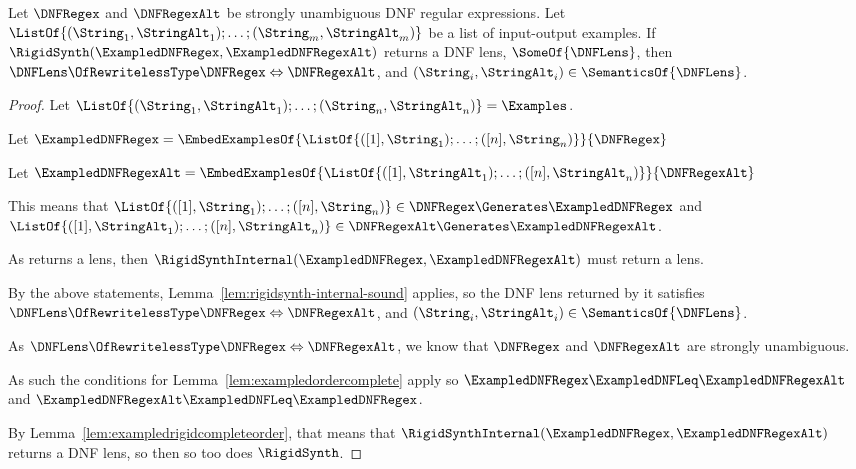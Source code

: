 \documentclass[acmsmall,screen]{acmart}
\begin{document}
\begin{mylemma}
  \label{lem:rigidsynth-sound}
  Let $\DNFRegex$ and $\DNFRegexAlt$ be strongly unambiguous DNF regular
  expressions.
  Let\\ $\ListOf{(\String_1,\StringAlt_1);\ldots;(\String_m,\StringAlt_m)}$ be a
  list of input-output examples.
  If $\RigidSynth(\ExampledDNFRegex,\ExampledDNFRegexAlt)$ returns
  a DNF lens, $\SomeOf{\DNFLens}$, then  $\DNFLens \OfRewritelessType \DNFRegex 
  \Leftrightarrow \DNFRegexAlt$, and $(\String_i,\StringAlt_i) \in
  \SemanticsOf{\DNFLens}$. 
\end{mylemma}
\begin{proof}
  Let $\ListOf{(\String_1,\StringAlt_1);\ldots;(\String_n,\StringAlt_n)} =
  \Examples$.
  
  Let $\ExampledDNFRegex =
  \EmbedExamplesOf{\ListOf{([1],\String_1);\ldots;([n],\String_n)}}{\DNFRegex}$

  Let $\ExampledDNFRegexAlt = \EmbedExamplesOf{\ListOf{([1],\StringAlt_1);\ldots;([n],\StringAlt_n)}}{\DNFRegexAlt}$

  This means that $\ListOf{([1],\String_1);\ldots;([n],\String_n)} \in \DNFRegex
  \Generates \ExampledDNFRegex$ and
  $\ListOf{([1],\StringAlt_1);\ldots;([n],\StringAlt_n)} \in \DNFRegexAlt
  \Generates \ExampledDNFRegexAlt$.

  As \RigidSynth{} returns a lens, then
  $\RigidSynthInternal(\ExampledDNFRegex,\ExampledDNFRegexAlt)$ must return a
  lens.

  By the above statements, Lemma~\ref{lem:rigidsynth-internal-sound} applies, so
  the DNF lens returned by it satisfies $\DNFLens \OfRewritelessType \DNFRegex
  \Leftrightarrow \DNFRegexAlt$, and
  $(\String_i,\StringAlt_i)\in\SemanticsOf{\DNFLens}$.

  As $\DNFLens \OfRewritelessType \DNFRegex \Leftrightarrow \DNFRegexAlt$, we
  know that $\DNFRegex$ and $\DNFRegexAlt$ are strongly unambiguous.

  As such the conditions for Lemma~\ref{lem:exampledordercomplete} apply so
  $\ExampledDNFRegex \ExampledDNFLeq \ExampledDNFRegexAlt$ and
  $\ExampledDNFRegexAlt \ExampledDNFLeq \ExampledDNFRegex$.

  By Lemma~\ref{lem:exampledrigidcompleteorder}, that means that
  $\RigidSynthInternal(\ExampledDNFRegex,\ExampledDNFRegexAlt)$ returns a DNF
  lens, so then so too does $\RigidSynth$.




\end{proof}
\end{document}
